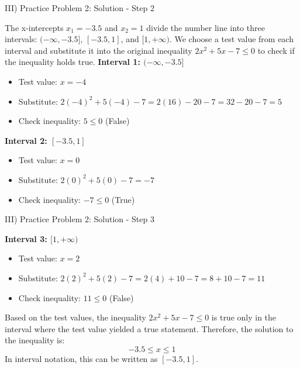 \documentclass[aspectratio=169]{beamer}
\begin{document}
\begin{frame}{III) Practice Problem 2: Solution - Step 2}
    \begin{tcolorbox}[colback=lightgray,colframe=accent,title=Solution: Step 2 - Use Test Values]
        \footnotesize
        The x-intercepts $x_1 = -3.5$ and $x_2 = 1$ divide the number line into three intervals: $(-\infty, -3.5]$, $[-3.5, 1]$, and $[1, +\infty)$.
        \newline
        We choose a test value from each interval and substitute it into the original inequality $2x^2+5x-7 \leq 0$ to check if the inequality holds true.
        \newline
        \textbf{Interval 1: $(-\infty, -3.5]$}
        \begin{itemize}
            \item Test value: $x=-4$
            \item Substitute: $2(-4)^2 + 5(-4) - 7 = 2(16) - 20 - 7 = 32 - 20 - 7 = 5$
            \item Check inequality: $5 \leq 0$ (False)
        \end{itemize}
        \newline
        \textbf{Interval 2: $[-3.5, 1]$}
        \begin{itemize}
            \item Test value: $x=0$
            \item Substitute: $2(0)^2 + 5(0) - 7 = -7$
            \item Check inequality: $-7 \leq 0$ (True)
        \end{itemize}
    \end{tcolorbox}
\end{frame}

\begin{frame}{III) Practice Problem 2: Solution - Step 3}
    \begin{tcolorbox}[colback=lightgray,colframe=accent,title=Solution: Step 3 - Use Test Values (Cont.) and State Solution]
        \footnotesize
        \textbf{Interval 3: $[1, +\infty)$}
        \begin{itemize}
            \item Test value: $x=2$
            \item Substitute: $2(2)^2 + 5(2) - 7 = 2(4) + 10 - 7 = 8 + 10 - 7 = 11$
            \item Check inequality: $11 \leq 0$ (False)
        \end{itemize}
        \newline
        Based on the test values, the inequality $2x^2+5x-7 \leq 0$ is true only in the interval where the test value yielded a true statement.
        \newline
        Therefore, the solution to the inequality is:
        \[
            -3.5 \leq x \leq 1
        \]
        In interval notation, this can be written as $[-3.5, 1]$.
    \end{tcolorbox}
\end{frame}
\end{document}
